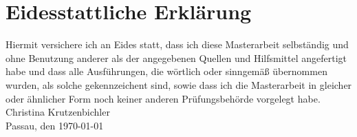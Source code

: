 \section*{Eidesstattliche Erkl\"{a}rung}
Hiermit versichere ich an Eides statt, dass ich diese Masterarbeit selbst\"{a}ndig und ohne Benutzung anderer als der angegebenen Quellen und Hilfsmittel angefertigt habe und dass alle Ausführungen, die w\"{o}rtlich oder \mbox{sinngem\"{a}\ss} \mbox{\"{u}bernommen} wurden, als solche gekennzeichent sind, sowie dass ich die Masterarbeit in gleicher oder ähnlicher Form noch keiner anderen Pr\"{u}fungsbeh\"{o}rde vorgelegt habe.\\
Christina Krutzenbichler\\
Passau, den \today
